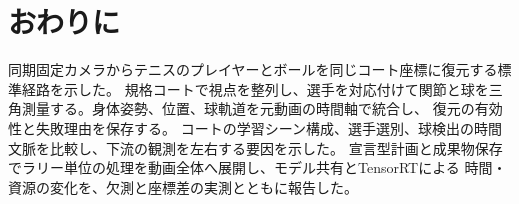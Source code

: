 \section{おわりに}
\label{sec:conclusion}

同期固定カメラからテニスのプレイヤーとボールを同じコート座標に復元する標準経路を示した。
規格コートで視点を整列し、選手を対応付けて関節と球を三角測量する。身体姿勢、位置、球軌道を元動画の時間軸で統合し、
復元の有効性と失敗理由を保存する。
コートの学習シーン構成、選手選別、球検出の時間文脈を比較し、下流の観測を左右する要因を示した。
宣言型計画と成果物保存でラリー単位の処理を動画全体へ展開し、モデル共有とTensorRTによる
時間・資源の変化を、欠測と座標差の実測とともに報告した。
